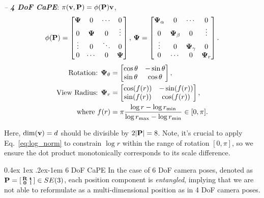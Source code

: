 \documentclass[10pt,twocolumn,letterpaper]{article}
\makeatletter
\renewcommand{\paragraph}{%
  \@startsection{paragraph}{4}%
  {\z@}{0.4ex \@plus 1ex \@minus .2ex}{-1em}%
  {\normalfont\normalsize\bfseries}%
}
\makeatother
\begin{document}
{\it -- \textbf{4 DoF CaPE}}: $\pi ({\bf v},{\bf P})= {\bf \phi(P)}{\bf v}$,
{
\footnotesize
\begin{align}
\setlength\arraycolsep{4pt}
{\bf \phi(P)} = 
\begin{bmatrix}
 {\bf \Psi} & 0 & \cdots & 0 \\
 0 & {\bf \Psi} & 0 & \vdots \\
 \vdots & 0 & \ddots & 0  \\
0 & \cdots & 0 &  {\bf \Psi} 
\end{bmatrix},\, {\bf \Psi}=
\begin{bmatrix}
 {\bf \Psi}_\alpha & 0 & \cdots & 0 \\
 0 & {\bf \Psi}_\beta & 0 & \vdots \\
 \vdots & 0 & {\bf \Psi}_\gamma & 0  \\
0 & \cdots & 0 &  {\bf \Psi}_r
\end{bmatrix}.
\end{align}
}
\vspace{-2mm}
{\footnotesize
\begin{align}
\text{Rotation: } {\bf \Psi}_\theta &= 
\begin{bmatrix}
\cos \theta & -\sin \theta \\
\sin \theta & \cos \theta
\end{bmatrix}, \\
\text{View Radius: } {\bf \Psi}_r &= 
\begin{bmatrix}
\cos (f(r)) & -\sin (f(r)) \\
\sin (f(r)) & \cos (f(r))
\end{bmatrix},\\
\text{where } f(r) &= \pi\frac{\log r - \log r_{\min}}{\log r_{\max} - \log r_{\min}} \in [0, \pi]\label{eq:log_norm}.
\end{align}
}

Here, $\dim({\bf v})=d$ should be divisible by $2|{\bf P}|=8$.
Note, it's crucial to apply Eq.~\ref{eq:log_norm} to constrain $\log r$ within the range of rotation $[0, \pi]$, so we ensure the dot product monotonically corresponds to its scale difference.

\paragraph{6 DoF CaPE} In the case of 6 DoF camera poses, denoted as  ${\bf P}=\begin{bsmallmatrix}
    {\bf R} & {\bf t} \\
    {\bf 0} & 1
\end{bsmallmatrix}\in SE(3)$, each position component is {\it entangled}, implying that we are not able to reformulate as a multi-dimensional position as in 4 DoF camera poses.
\end{document}
